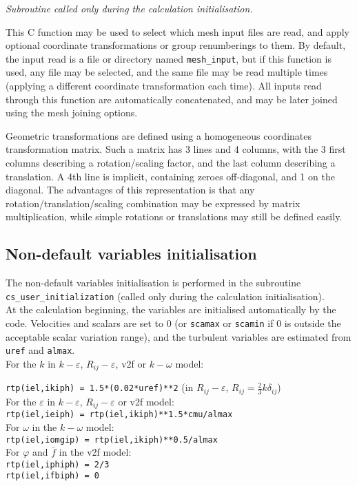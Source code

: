 {{\noindent
\textit{Subroutine called only during the calculation initialisation.}

This C function may be used to select which mesh input files
are read, and apply optional coordinate transformations or group renumberings
to them. By default, the input read is a file or directory named
\texttt{mesh\_input}, but if this function is used, any file may be selected,
and the same file may be read multiple times (applying a different
coordinate transformation each time).
All inputs read through this function are automatically concatenated, and
may be later joined using the mesh joining options.

Geometric transformations are defined using a homogeneous coordinates
transformation matrix. Such a matrix has 3 lines and 4 columns, with the
3 first columns describing a rotation/scaling factor, and the last column
describing a translation. A 4th line is implicit, containing zeroes
off-diagonal, and 1 on the diagonal. The advantages of this representation
is that any rotation/translation/scaling combination may be expressed
by matrix multiplication, while simple rotations or translations
may still be defined easily.

\subsection{Non-default variables initialisation} \label{sec:cs_user_initialization}

The non-default variables initialisation is performed in the subroutine \texttt{cs\_user\_initialization} (called only during the calculation initialisation).\\ At the calculation beginning, the variables are initialised
automatically by the code. Velocities and scalars are set to 0 (or \texttt{scamax} or \texttt{scamin} if 0 is outside the acceptable
scalar variation range), and the turbulent variables are estimated from
\texttt{uref} and \texttt{almax}. \\
For the $k$ in $k-\varepsilon$, $R_{ij}-\varepsilon$, v2f or $k-\omega$
model:\\
{\texttt{rtp(iel,ikiph) = 1.5*(0.02*uref)**2}
(in $R_{ij}-\varepsilon$,  $R_{ij}=\frac{2}{3}k\delta_{ij}$)\\
For the $\varepsilon$ in $k-\varepsilon$, $R_{ij}-\varepsilon$ or v2f model:\\
\texttt{rtp(iel,ieiph) = rtp(iel,ikiph)**1.5*cmu/almax}\\
For $\omega$ in the $k-\omega$ model:\\
\texttt{rtp(iel,iomgip) = rtp(iel,ikiph)**0.5/almax}\\
For $\varphi$ and $\overline{f}$ in the v2f model:\\
\texttt{rtp(iel,iphiph) = 2/3}\\
\texttt{rtp(iel,ifbiph) = 0}

}}}
